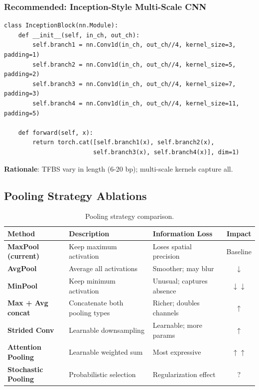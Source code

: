 \documentclass[11pt,a4paper]{article}
\begin{document}
\subsubsection{Recommended: Inception-Style Multi-Scale CNN}

\begin{verbatim}
class InceptionBlock(nn.Module):
    def __init__(self, in_ch, out_ch):
        self.branch1 = nn.Conv1d(in_ch, out_ch//4, kernel_size=3, padding=1)
        self.branch2 = nn.Conv1d(in_ch, out_ch//4, kernel_size=5, padding=2)
        self.branch3 = nn.Conv1d(in_ch, out_ch//4, kernel_size=7, padding=3)
        self.branch4 = nn.Conv1d(in_ch, out_ch//4, kernel_size=11, padding=5)
    
    def forward(self, x):
        return torch.cat([self.branch1(x), self.branch2(x), 
                         self.branch3(x), self.branch4(x)], dim=1)
\end{verbatim}

\textbf{Rationale}: TFBS vary in length (6-20 bp); multi-scale kernels capture all.

\subsection{Pooling Strategy Ablations}

\begin{table}[H]
\centering
\begin{tabular}{L{3cm}L{5cm}L{3cm}c}
\toprule
\textbf{Method} & \textbf{Description} & \textbf{Information Loss} & \textbf{Impact} \\
\midrule
\textbf{MaxPool (current)} & Keep maximum activation & Loses spatial precision & Baseline \\
\textbf{AvgPool} & Average all activations & Smoother; may blur & \textcolor{negative}{$\downarrow$} \\
\textbf{MinPool} & Keep minimum activation & Unusual; captures absence & \textcolor{negative}{$\downarrow\downarrow$} \\
\textbf{Max + Avg concat} & Concatenate both pooling types & Richer; doubles channels & \textcolor{positive}{$\uparrow$} \\
\textbf{Strided Conv} & Learnable downsampling & Learnable; more params & \textcolor{positive}{$\uparrow$} \\
\textbf{Attention Pooling} & Learnable weighted sum & Most expressive & \textcolor{positive}{$\uparrow\uparrow$} \\
\textbf{Stochastic Pooling} & Probabilistic selection & Regularization effect & \textcolor{uncertain}{$?$} \\
\bottomrule
\end{tabular}
\caption{Pooling strategy comparison.}
\end{table}
\end{document}
